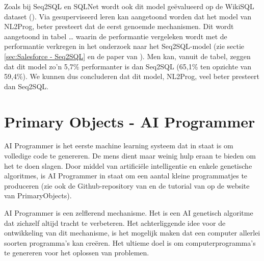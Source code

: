 Zoals bij Seq2SQL en SQLNet wordt ook dit model geëvalueerd op de WikiSQL dataset (\textcite{wikisql}). Via gesuperviseerd leren kan aangetoond worden dat het model van NL2Prog, beter presteert dat de eerst genoemde mechanismen. Dit wordt aangetoond in tabel … waarin de performantie vergeleken wordt met de performantie verkregen in het onderzoek naar het Seq2SQL-model (zie sectie  \ref{sec:Salesforce - Seq2SQL} en de paper van \textcite{seq2sqlPaper}). Men kan, vanuit de tabel, zeggen dat dit model zo’n 5,7\% performanter is dan Seq2SQL (65,1\% ten opzichte van 59,4\%). We kunnen dus concluderen dat dit model, NL2Prog, veel beter presteert dan Seq2SQL.

\section{Primary Objects - AI Programmer}

AI Programmer is het eerste machine learning systeem dat in staat is om volledige code te genereren. De mens dient maar weinig hulp eraan te bieden om het te doen slagen. Door middel van artificiële intelligentie en enkele genetische algoritmes, is AI Programmer in staat om een aantal kleine programmatjes te produceren (zie ook de Github-repository van \textcite{github} en de tutorial van \textcite{primaryObject} op de website van PrimaryObjects).

AI Programmer is een zelflerend mechanisme. Het is een AI genetisch algoritme dat zichzelf altijd tracht te verbeteren. Het achterliggende idee voor de ontwikkeling van dit mechanisme, is het mogelijk maken dat een computer allerlei soorten programma's kan creëren. Het ultieme doel is om computerprogramma’s te genereren voor het oplossen van problemen.

